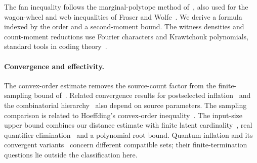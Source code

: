 The fan inequality follows the marginal-polytope method of~\cite[Section IV.D]{WSF2019}, also used for the wagon-wheel and web inequalities of Fraser and Wolfe~\cite{FraserWolfe2018}. We derive a formula indexed by the order and a second-moment bound. The witness densities and count-moment reductions use Fourier characters and Krawtchouk polynomials, standard tools in coding theory~\cite{MacWilliamsSloane1977}.

\paragraph{Convergence and effectivity.}
The convex-order estimate removes the source-count factor from the finite-sampling bound of~\cite{NW2020}. Related convergence results for postselected inflation~\cite{Gitton2022} and the combinatorial hierarchy~\cite{Fraser2020} also depend on source parameters. The sampling comparison is related to Hoeffding's convex-order inequality~\cite[Theorem 4]{Hoeffding1963}. The input-size upper bound combines our distance estimate with finite latent cardinality~\cite{RGW2018}, real quantifier elimination~\cite{BasuPollackRoy2006} and a polynomial root bound. Quantum inflation and its convergent variants~\cite{WolfeEtAl2021QuantumInflation,LigthartGachechiladzeGross2023} concern different compatible sets; their finite-termination questions lie outside the classification here.\par

